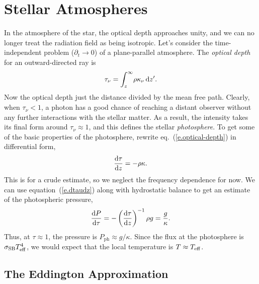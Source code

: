\chapter[Stellar Atmospheres]{Stellar Atmospheres}

In the atmosphere of the star, the optical depth approaches unity, and we can no longer treat the radiation field as being isotropic. Let's consider the time-independent problem ($\partial_{t}\to 0$) of a plane-parallel atmosphere. The \emph{optical depth} for an outward-directed ray is
\begin{equation}\label{e.optical-depth}
\tau_{\nu} = \int _{z}^{\infty}\!\rho\kappa_{\nu}\,\mathrm{d} z'.
\end{equation}
Now the optical depth just the distance divided by the mean free path. Clearly, when $\tau_{\nu} < 1$, a photon has a good chance of reaching a distant observer without any further interactions with the stellar matter.  As a result, the intensity takes its final form around $\tau_{\nu} \approx 1$, and this defines the stellar \emph{photosphere}. To get some of the basic properties of the photosphere, rewrite eq.~(\ref{e.optical-depth}) in differential form,
\begin{equation}\label{e.dtaudz}
\frac{\mathrm{d}\tau}{\mathrm{d} z} = -\rho\kappa.
\end{equation}
This is for a crude estimate, so we neglect the frequency dependence for now.  We can use equation~(\ref{e.dtaudz}) along with hydrostatic balance to get an estimate of the photospheric pressure,
\begin{equation}\label{e.photo-pressure}
\frac{\mathrm{d} P}{\mathrm{d} \tau} = -\left(\frac{\mathrm{d} \tau}{\mathrm{d} z}\right)^{-1}\rho g = \frac{g}{\kappa}.
\end{equation}
Thus, at $\tau \approx 1$, the pressure is $P_{\mathrm{ph}}\approx g/\kappa$. Since the flux at the photosphere is $\sigma_{\mathrm{SB}} T_{\mathrm{eff}}^{4}$, we would expect that the local temperature is $T\approx T_{\mathrm{eff}}$.

\section{The Eddington Approximation}


